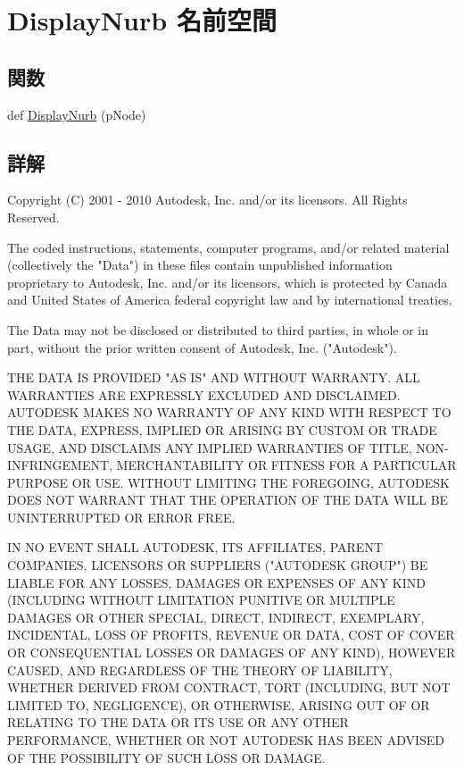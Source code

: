 \hypertarget{namespace_display_nurb}{}\section{Display\+Nurb 名前空間}
\label{namespace_display_nurb}
\subsection*{関数}
\begin{DoxyCompactItemize}
\item 
def \hyperlink{namespace_display_nurb_ac2e0d6539d92bec45881cb3e1161de28}{Display\+Nurb} (p\+Node)
\end{DoxyCompactItemize}


\subsection{詳解}
\begin{DoxyVerb} Copyright (C) 2001 - 2010 Autodesk, Inc. and/or its licensors.
 All Rights Reserved.

 The coded instructions, statements, computer programs, and/or related material 
 (collectively the "Data") in these files contain unpublished information 
 proprietary to Autodesk, Inc. and/or its licensors, which is protected by 
 Canada and United States of America federal copyright law and by international 
 treaties. 
 
 The Data may not be disclosed or distributed to third parties, in whole or in
 part, without the prior written consent of Autodesk, Inc. ("Autodesk").

 THE DATA IS PROVIDED "AS IS" AND WITHOUT WARRANTY.
 ALL WARRANTIES ARE EXPRESSLY EXCLUDED AND DISCLAIMED. AUTODESK MAKES NO
 WARRANTY OF ANY KIND WITH RESPECT TO THE DATA, EXPRESS, IMPLIED OR ARISING
 BY CUSTOM OR TRADE USAGE, AND DISCLAIMS ANY IMPLIED WARRANTIES OF TITLE, 
 NON-INFRINGEMENT, MERCHANTABILITY OR FITNESS FOR A PARTICULAR PURPOSE OR USE. 
 WITHOUT LIMITING THE FOREGOING, AUTODESK DOES NOT WARRANT THAT THE OPERATION
 OF THE DATA WILL BE UNINTERRUPTED OR ERROR FREE. 
 
 IN NO EVENT SHALL AUTODESK, ITS AFFILIATES, PARENT COMPANIES, LICENSORS
 OR SUPPLIERS ("AUTODESK GROUP") BE LIABLE FOR ANY LOSSES, DAMAGES OR EXPENSES
 OF ANY KIND (INCLUDING WITHOUT LIMITATION PUNITIVE OR MULTIPLE DAMAGES OR OTHER
 SPECIAL, DIRECT, INDIRECT, EXEMPLARY, INCIDENTAL, LOSS OF PROFITS, REVENUE
 OR DATA, COST OF COVER OR CONSEQUENTIAL LOSSES OR DAMAGES OF ANY KIND),
 HOWEVER CAUSED, AND REGARDLESS OF THE THEORY OF LIABILITY, WHETHER DERIVED
 FROM CONTRACT, TORT (INCLUDING, BUT NOT LIMITED TO, NEGLIGENCE), OR OTHERWISE,
 ARISING OUT OF OR RELATING TO THE DATA OR ITS USE OR ANY OTHER PERFORMANCE,
 WHETHER OR NOT AUTODESK HAS BEEN ADVISED OF THE POSSIBILITY OF SUCH LOSS
 OR DAMAGE. \end{DoxyVerb}
 

